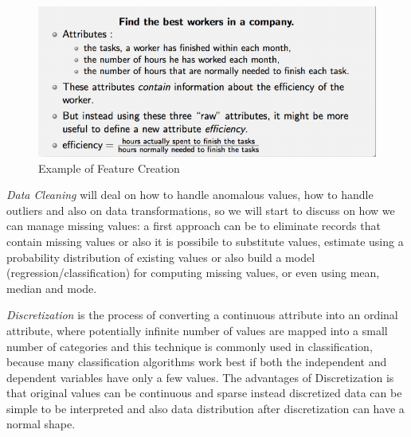 \begin{description}
                               \begin{figure}
                                    \caption{Example of Feature Creation}
                                    \label{img:featureCreation}
                                    \includegraphics[width=\textwidth]{Images/featureCreation}
                               \end{figure}
\end{description}
\emph{Data Cleaning} will deal on how to handle anomalous values, how to handle outliers and also on data transformations, so we will
start to discuss on how we can manage missing values: a first approach can be to eliminate records that contain missing values or also it 
is possibile to substitute values, estimate using a probability distribution of existing values or also build a model (regression/classification) 
for computing missing values, or even using mean, median and mode.

\emph{Discretization} is the process of converting a continuous attribute into an ordinal attribute, where potentially infinite number of values
are mapped into a small number of categories and this technique is commonly used in classification, because many classification algorithms 
work best if both the independent and dependent variables have only a few values.\newline
The advantages of Discretization is that original values can be continuous and sparse instead discretized data can be simple to be interpreted 
and also data distribution after discretization can have a normal shape.

